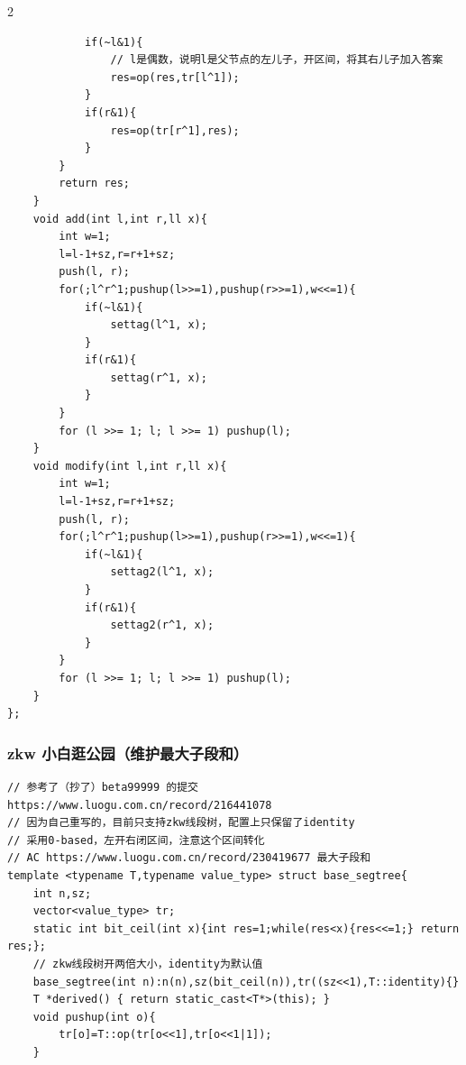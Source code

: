 \begin{multicols*}{2}
\begin{verbatim}
            if(~l&1){   
                // l是偶数，说明l是父节点的左儿子，开区间，将其右儿子加入答案
                res=op(res,tr[l^1]);
            }
            if(r&1){
                res=op(tr[r^1],res);
            }
        }
        return res;
    }
    void add(int l,int r,ll x){
        int w=1;
        l=l-1+sz,r=r+1+sz;
        push(l, r);
        for(;l^r^1;pushup(l>>=1),pushup(r>>=1),w<<=1){
            if(~l&1){
                settag(l^1, x);
            }
            if(r&1){
                settag(r^1, x);
            }
        }
        for (l >>= 1; l; l >>= 1) pushup(l);
    }
    void modify(int l,int r,ll x){
        int w=1;
        l=l-1+sz,r=r+1+sz;
        push(l, r);
        for(;l^r^1;pushup(l>>=1),pushup(r>>=1),w<<=1){
            if(~l&1){
                settag2(l^1, x);
            }
            if(r&1){
                settag2(r^1, x);
            }
        }
        for (l >>= 1; l; l >>= 1) pushup(l);
    }
};
		\end{verbatim}

		\subsubsection{zkw 小白逛公园（维护最大子段和）}
		\begin{verbatim}
// 参考了（抄了）beta99999 的提交  https://www.luogu.com.cn/record/216441078
// 因为自己重写的，目前只支持zkw线段树，配置上只保留了identity
// 采用0-based，左开右闭区间，注意这个区间转化
// AC https://www.luogu.com.cn/record/230419677 最大子段和
template <typename T,typename value_type> struct base_segtree{
    int n,sz;
    vector<value_type> tr;
    static int bit_ceil(int x){int res=1;while(res<x){res<<=1;} return res;};
    // zkw线段树开两倍大小，identity为默认值
    base_segtree(int n):n(n),sz(bit_ceil(n)),tr((sz<<1),T::identity){}    
    T *derived() { return static_cast<T*>(this); }
    void pushup(int o){
        tr[o]=T::op(tr[o<<1],tr[o<<1|1]);
    }


\end{verbatim}
\end{multicols*}
